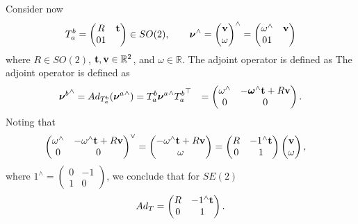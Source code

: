 Consider now 
\[
T_a^b = \begin{pmatrix} R & \mathbf{t} \\ 0 1 \end{pmatrix} \in SO(2), \qquad \boldsymbol{\nu}^\wedge = \begin{pmatrix} \mathbf{v} \\ \omega \end{pmatrix}^\wedge = \begin{pmatrix} \omega^\wedge & \mathbf{v} \\ 0 1 \end{pmatrix}
\]
where $R\in SO(2)$, $\mathbf{t}, \mathbf{v} \in \mathbb{R}^2$, and $\omega\in\mathbb{R}$.
The adjoint operator is defined as
The adjoint operator is defined as
\begin{align*}
{\boldsymbol{\nu}^b}^\wedge = Ad_{T_a^b}({\boldsymbol{\nu}^a}^\wedge) &= T_a^b {\boldsymbol{\nu}^a}^\wedge {T_a^b}^\top 
	&= \begin{pmatrix} \omega^\wedge & -\boldsymbol{\omega}^\wedge \mathbf{t} + R\mathbf{v} \\ 0 & 0 \end{pmatrix}.
\end{align*}
Noting that 
\begin{align*}
\begin{pmatrix} \omega^\wedge & -\omega^\wedge \mathbf{t} + R\mathbf{v} \\ 0 & 0 \end{pmatrix}^\vee 
	&= \begin{pmatrix} 	-\omega^\wedge \mathbf{t} + R\mathbf{v} \\ \omega \end{pmatrix} 
	= \begin{pmatrix} R & -1^\wedge\mathbf{t} \\ 0 & 1 \end{pmatrix}\begin{pmatrix} \mathbf{v} \\ \omega \end{pmatrix},
\end{align*}
where $1^\wedge = \begin{pmatrix} 0 & -1 \\ 1 & 0 \end{pmatrix}$, we conclude that for $SE(2)$
\[
Ad_T = \begin{pmatrix} R & -1^\wedge\mathbf{t} \\ 0 & 1 \end{pmatrix}.
\]

